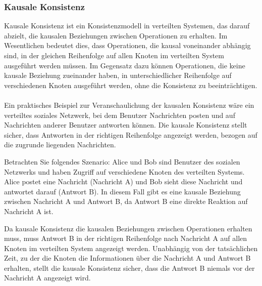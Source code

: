 \subsubsection{Kausale Konsistenz}
Kausale Konsistenz ist ein Konsistenzmodell in verteilten Systemen, das darauf abzielt, die kausalen Beziehungen zwischen Operationen zu erhalten. Im Wesentlichen bedeutet dies, dass Operationen, die kausal voneinander abhängig sind, in der gleichen Reihenfolge auf allen Knoten im verteilten System ausgeführt werden müssen. Im Gegensatz dazu können Operationen, die keine kausale Beziehung zueinander haben, in unterschiedlicher Reihenfolge auf verschiedenen Knoten ausgeführt werden, ohne die Konsistenz zu beeinträchtigen.
\\\\
Ein praktisches Beispiel zur Veranschaulichung der kausalen Konsistenz wäre ein verteiltes soziales Netzwerk, bei dem Benutzer Nachrichten posten und auf Nachrichten anderer Benutzer antworten können. Die kausale Konsistenz stellt sicher, dass Antworten in der richtigen Reihenfolge angezeigt werden, bezogen auf die zugrunde liegenden Nachrichten.

Betrachten Sie folgendes Szenario: Alice und Bob sind Benutzer des sozialen Netzwerks und haben Zugriff auf verschiedene Knoten des verteilten Systems. Alice postet eine Nachricht (Nachricht A) und Bob sieht diese Nachricht und antwortet darauf (Antwort B). In diesem Fall gibt es eine kausale Beziehung zwischen Nachricht A und Antwort B, da Antwort B eine direkte Reaktion auf Nachricht A ist.

Da kausale Konsistenz die kausalen Beziehungen zwischen Operationen erhalten muss, muss Antwort B in der richtigen Reihenfolge nach Nachricht A auf allen Knoten im verteilten System angezeigt werden. Unabhängig von der tatsächlichen Zeit, zu der die Knoten die Informationen über die Nachricht A und Antwort B erhalten, stellt die kausale Konsistenz sicher, dass die Antwort B niemals vor der Nachricht A angezeigt wird.

